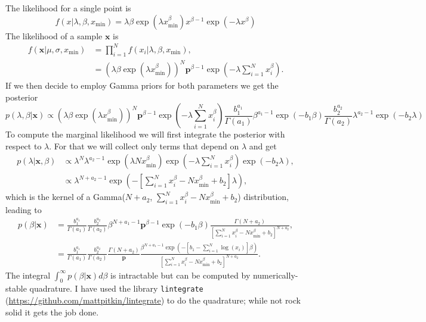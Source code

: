 \documentclass[a4paper, notitlepage, 10pt]{article}
\begin{document}
The likelihood for a single point is
$$ f(x | \lambda, \beta, x_{\min}) = \lambda\beta\exp\left(\lambda x_{\min}^\beta\right) x^{\beta-1} \exp\left(-\lambda x^\beta \right) $$
The likelihood of a sample $\boldsymbol x$ is
\begin{align}
  f(\boldsymbol x | \mu, \sigma, x_{\min}) &= \prod_{i = 1}^N f(x_i | \lambda, \beta, x_{\min}), \\
  &= \left(\lambda\beta\exp\left(\lambda x_{\min}^\beta\right)\right)^N \boldsymbol p^{\beta -1} \exp\left(-\lambda \sum_{i = 1}^N x_i^\beta \right).
\end{align}
If we then decide to employ Gamma priors for both parameters we get the posterior
\begin{equation}
 p(\lambda, \beta | \boldsymbol x) \propto \left(\lambda\beta\exp\left(\lambda x_{\min}^\beta\right)\right)^N \boldsymbol p^{\beta -1} \exp\left(-\lambda \sum_{i = 1}^N x_i^\beta \right) \frac{b_1^{a_1}}{\Gamma(a_1)}\beta^{a_1 - 1}\exp(-b_1\beta) \frac{b_2^{a_2}}{\Gamma(a_2)}\lambda^{a_2 - 1}\exp(-b_2\lambda)
\end{equation}
To compute the marginal likelihood we will first integrate the posterior with respect to $\lambda$.
For that  we will collect only terms that depend on $\lambda$ and get
\begin{align*}
 p(\lambda | \boldsymbol x, \beta) &\propto \lambda^N \lambda^{a_2 -1} \exp\left(\lambda N x_{\min}^\beta\right)\exp\left(-\lambda \sum_{i = 1}^N x_i^\beta \right)\exp(-b_2\lambda), \\
 &\propto \lambda^{N + a_2 -1} \exp\left(-\left[\sum_{i = 1}^N x_i^\beta - N x_{\min}^\beta + b_2\right] \lambda  \right),
\end{align*}
which is the kernel of a Gamma($N + a_2$, $\sum_{i = 1}^N x_i^\beta - N x_{\min}^\beta + b_2$) distribution, leading to
\begin{align}
  p(\beta | \boldsymbol x) &= \frac{b_1^{a_1}}{\Gamma(a_1)} \frac{b_2^{a_2}}{\Gamma(a_2)} \beta^{N + a_1 - 1} \boldsymbol p^{\beta -1} \exp(-b_1\beta)  \frac{\Gamma(N + a_2)}{\left[\sum_{i = 1}^N x_i^\beta  - Nx_{\min}^\beta + b_2\right]^{N + a_2}}, \\
&= \frac{b_1^{a_1}}{\Gamma(a_1)} \frac{b_2^{a_2}}{\Gamma(a_2)}  \frac{\Gamma(N + a_2)}{\boldsymbol p } \frac{\beta^{N + a_1 - 1}  \exp\left(-[b_1 - \sum_{i=1}^N \log(x_i)]\beta\right)}{\left[\sum_{i = 1}^N x_i^\beta - Nx_{\min}^\beta + b_2 \right]^{N + a_2}}.
\end{align}
The integral $\int_0^\infty p(\beta | \boldsymbol x)d\beta$ is intractable but can be computed by numerically-stable quadrature.
I have used the library \verb|lintegrate| (\url{https://github.com/mattpitkin/lintegrate}) to do the quadrature; while not rock solid it gets the job done.


\end{document}
